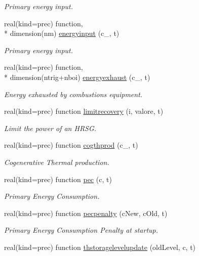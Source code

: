 \begin{DoxyCompactItemize}
\begin{DoxyCompactList}\small\item\em Primary energy input. \end{DoxyCompactList}\item 
real(kind=prec) function, \\*
dimension(nm) \hyperlink{classenergy_aebd116fdbb931db63a6450c7ba3197df}{energyinput} (c\-\_\-, t)
\begin{DoxyCompactList}\small\item\em Primary energy input. \end{DoxyCompactList}\item 
real(kind=prec) function, \\*
dimension(ntrig+nboi) \hyperlink{classenergy_aa9595768898cb233d53596e9ce19744f}{energyexhaust} (c\-\_\-, t)
\begin{DoxyCompactList}\small\item\em Energy exhausted by combustions equipment. \end{DoxyCompactList}\item 
real(kind=prec) function \hyperlink{classenergy_adee2b0ef7e3ae6a8da4a2357ffa14a28}{limitrecovery} (i, valore, t)
\begin{DoxyCompactList}\small\item\em Limit the power of an H\-R\-S\-G. \end{DoxyCompactList}\item 
real(kind=prec) function \hyperlink{classenergy_a6060381a3418f406c8ca108f9c5a7fd5}{cogthprod} (c\-\_\-, t)
\begin{DoxyCompactList}\small\item\em Cogenerative Thermal production. \end{DoxyCompactList}\item 
real(kind=prec) function \hyperlink{classenergy_a082e1efb7fb9b51f62cfe800fefe1585}{pec} (c, t)
\begin{DoxyCompactList}\small\item\em Primary Energy Consumption. \end{DoxyCompactList}\item 
real(kind=prec) function \hyperlink{classenergy_a85b1719a96ad6c8ccc87e720cb6b0397}{pecpenalty} (c\-New, c\-Old, t)
\begin{DoxyCompactList}\small\item\em Primary Energy Consumption Penalty at startup. \end{DoxyCompactList}\item 
real(kind=prec) function \hyperlink{classenergy_a59e350e8898c5358a92c3475d3cedb18}{thstoragelevelupdate} (old\-Level, c, t)

\end{DoxyCompactItemize}
